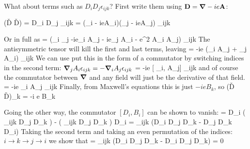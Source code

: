 
What about terms such as $D_i D_j \epsilon_{ijk}$?  First write them using $\mathbf{D} = \mbox{\boldmath$ \nabla $} - i e\mathbf{A}$:

\beq
	(\v{D} \times \v{D}) = D_i D_j \epsilon_{ijk} = (\grad_i - ieA_i)(\grad_j - ieA_j) \epsilon_{ijk}
\eeq

Or in full as
\beq
	= (\grad_i \grad_j -ie\grad_i A_j - ie\grad_j A_i - e^2 A_i A_j) \epsilon_{ijk}
\eeq
The antisymmetric tensor will kill the first and last terms, leaving
\beq
	= -ie (\grad_i A_j + \grad_j A_i) \epsilon_{ijk}
\eeq
We can use put this in the form of a commutator by switching indices in the second term: $\mbox{\boldmath$ \nabla $} _j A_i \epsilon_{ijk} = - \mbox{\boldmath$ \nabla $} _i A_j \epsilon_{ijk}$
\beq
	= -ie [ \grad_i, A_j] \epsilon_{ijk}
\eeq
and of course the commutator between $\grad$ and any field will just be the derivative of that field.
\beq
	= -ie \partial_i A_j \epsilon_{ijk}
\eeq
Finally, from Maxwell's equations this is just  $-ie B_k$, so 
\beq
	(\v{D} \times \v{D})_k = -i e B_k
\eeq

Going the other way, the commutator $[D_i, B_i]$ can be shown to vanish:
\beq
	[D_i, B_i] = D_i ( \epsilon_{ijk} D_j D_k ) - ( \epsilon_{ijk} D_j D_k ) D_i
			= \epsilon_{ijk} (D_i D_j D_k - D_j D_k D_i)
\eeq
Taking the second term and taking an even permutation of the indices: $i \to k \to j \to i$ we show that
\beq
	[D_i, B_i] = \epsilon_{ijk} (D_i D_j D_k - D_i D_j D_k) = 0
\eeq








